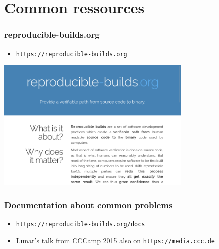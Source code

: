 \documentclass[14pt]{beamer}
\begin{document}
\section{Common ressources}

\begin{frame}
 \frametitle{reproducible-builds.org}

 \begin{itemize}
  \item \texttt{https://reproducible-builds.org}
 \end{itemize}
 \begin{center}
 \includegraphics[width=0.7\textwidth]{images/rbwww1.png}
 \end{center}
\end{frame}

\begin{frame}
 \frametitle{Documentation about common problems}
 \begin{itemize}
  \item \texttt{https://reproducible-builds.org/docs}
  \item Lunar's talk from CCCamp 2015 also on
  \texttt{https://media.ccc.de}
 \end{itemize}
\end{frame}
\end{document}
